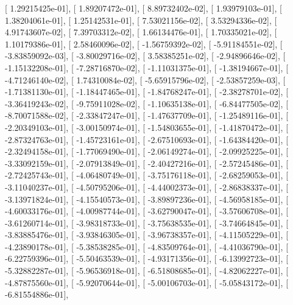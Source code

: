 \documentclass{article}
\begin{document}
       [  1.29215425e-01],
       [  1.89207472e-01],
       [  8.89732402e-02],
       [  1.93979103e-01],
       [  1.38204061e-01],
       [  1.25142531e-01],
       [  7.53021156e-02],
       [  3.53294336e-02],
       [  4.91743607e-02],
       [  7.39703312e-02],
       [  1.66134476e-01],
       [  1.70335021e-02],
       [  1.10179386e-01],
       [  2.58460096e-02],
       [ -1.56759392e-02],
       [ -5.91184551e-02],
       [ -3.83859092e-03],
       [ -3.80029716e-02],
       [  3.58385251e-02],
       [ -2.94896646e-02],
       [ -1.15132208e-01],
       [ -7.28716870e-02],
       [ -1.11031375e-01],
       [ -1.38194667e-01],
       [ -4.71246140e-02],
       [  1.74310084e-02],
       [ -5.65915796e-02],
       [ -2.53857259e-03],
       [ -1.71381130e-01],
       [ -1.18447465e-01],
       [ -1.84768247e-01],
       [ -2.38278701e-02],
       [ -3.36419243e-02],
       [ -9.75911028e-02],
       [ -1.10635138e-01],
       [ -6.84477505e-02],
       [ -8.70071588e-02],
       [ -2.33847247e-01],
       [ -1.47637709e-01],
       [ -1.25489116e-01],
       [ -2.20349103e-01],
       [ -3.00150974e-01],
       [ -1.54803655e-01],
       [ -1.41870472e-01],
       [ -2.87324763e-01],
       [ -1.45723161e-01],
       [ -2.67510693e-01],
       [ -1.64384420e-01],
       [ -2.32494158e-01],
       [ -1.77069490e-01],
       [ -2.06149274e-01],
       [ -2.09925225e-01],
       [ -3.33092159e-01],
       [ -2.07913849e-01],
       [ -2.40427216e-01],
       [ -2.57245486e-01],
       [ -2.72425743e-01],
       [ -4.06480749e-01],
       [ -3.75176118e-01],
       [ -2.68259053e-01],
       [ -3.11040237e-01],
       [ -4.50795206e-01],
       [ -4.44002373e-01],
       [ -2.86838337e-01],
       [ -3.13971824e-01],
       [ -4.15540573e-01],
       [ -3.89897236e-01],
       [ -4.56958185e-01],
       [ -4.60033176e-01],
       [ -4.00987744e-01],
       [ -3.62790047e-01],
       [ -3.57606708e-01],
       [ -3.61260714e-01],
       [ -3.98318733e-01],
       [ -3.75638535e-01],
       [ -3.74664845e-01],
       [ -3.83885476e-01],
       [ -3.93846305e-01],
       [ -3.96738357e-01],
       [ -4.11505229e-01],
       [ -4.23890178e-01],
       [ -5.38538285e-01],
       [ -4.83509764e-01],
       [ -4.41036790e-01],
       [ -6.22759396e-01],
       [ -5.50463539e-01],
       [ -4.93171356e-01],
       [ -6.13992723e-01],
       [ -5.32882287e-01],
       [ -5.96536918e-01],
       [ -6.51808685e-01],
       [ -4.82062227e-01],
       [ -4.87875560e-01],
       [ -5.92070644e-01],
       [ -5.00106703e-01],
       [ -5.05843172e-01],
       [ -6.81554886e-01],
\end{document}
